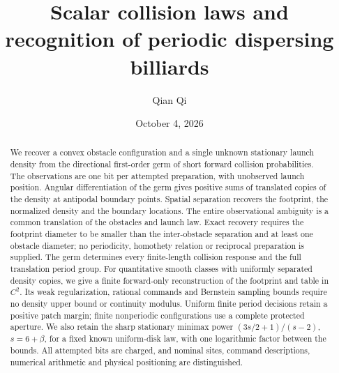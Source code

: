 \documentclass[11pt]{amsart}
\title[Scalar collision laws]{Scalar collision laws and recognition of periodic dispersing billiards}
\author{Qian Qi}
\date{October 4, 2026}
\theoremstyle{definition}\newtheorem{definition}[theorem]{Definition}
\theoremstyle{remark}\newtheorem{remark}[theorem]{Remark}
\numberwithin{equation}{section}
\begin{document}
\raggedbottom
\begin{abstract}
We recover a convex obstacle configuration and a single unknown
stationary launch density from the directional first-order germ of
short forward collision probabilities. The observations are one bit
per attempted preparation, with unobserved launch position. Angular
differentiation of the germ gives positive sums of translated copies
of the density at antipodal boundary points. Spatial separation
recovers the footprint, the normalized density and the boundary
locations. The entire observational ambiguity is a common translation
of the obstacles and launch law. Exact recovery requires the footprint
diameter to be smaller than the inter-obstacle separation and at least
one obstacle diameter; no periodicity, homothety relation or reciprocal
preparation is supplied. The germ determines every finite-length
collision response and the full translation period group.
For quantitative smooth classes with uniformly separated density
copies, we give a finite forward-only reconstruction of the footprint
and table in $C^2$. Its weak regularization, rational commands and
Bernstein sampling bounds require no density upper bound or continuity
modulus. Uniform finite period decisions retain a positive patch
margin; finite nonperiodic configurations use a complete protected
aperture. We also retain the sharp stationary minimax power
$(3s/2+1)/(s-2)$, $s=6+\beta$, for a fixed known uniform-disk law,
with one logarithmic factor between the bounds. All attempted bits
are charged, and nominal sites, command descriptions, numerical
arithmetic and physical positioning are distinguished.
\end{abstract}
\maketitle







\appendix

















\end{document}
